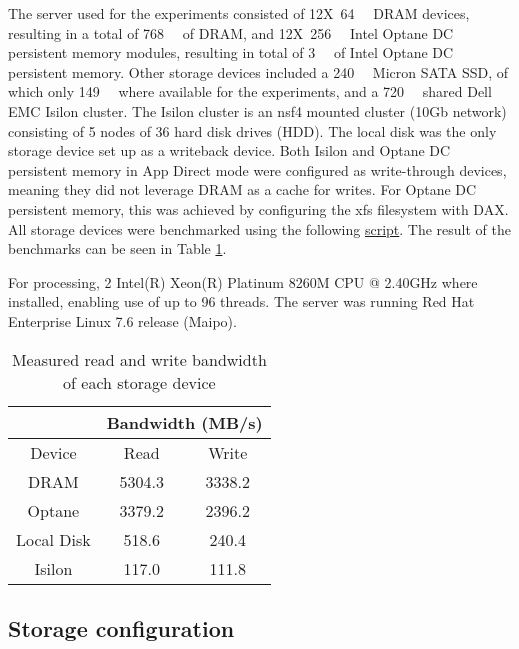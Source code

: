 \documentclass[conference]{IEEEtran}
\begin{document}
The server used for the experiments consisted of 12X~\SI{64}{\gibi\byte} DRAM devices,
resulting in a total of \SI{768}{\gibi\byte} of DRAM, and 12X~\SI{256}{\giga\byte} Intel Optane DC persistent memory
modules, resulting in total of \SI{3}{\tebi\byte} of Intel Optane DC persistent memory.
Other storage devices included a \SI{240}{\gibi\byte} Micron SATA SSD, of which
only \SI{149}{\gibi\byte} where available for the experiments, and a
\SI{720}{\tebi\byte} shared Dell EMC Isilon cluster. The Isilon cluster is an nsf4 mounted
cluster (10Gb network) consisting of 5 nodes of 36 hard disk drives (HDD). The local disk
was the only storage device set up as a writeback device. Both Isilon and Optane DC persistent memory in
App Direct mode were configured as write-through devices, meaning they did not leverage
DRAM as a cache for writes. For Optane DC persistent memory, this was achieved by configuring the xfs filesystem with
DAX. All storage devices were benchmarked using the following \href{https://github.com/ValHayot/paper-memory-storage/scripts/bench_disks.sh}{script}.
The result of the benchmarks can be seen in Table \ref{table:bandwidths}.

For processing,
2 Intel(R) Xeon(R) Platinum 8260M CPU @ 2.40GHz where installed, enabling use of up to 96 threads.
The server was running Red Hat Enterprise Linux 7.6 release (Maipo). 


\begin{table}
\begin{center}
 \begin{tabular}{ |c|c|c| } 
     \cline{2-3}
     \multicolumn{1}{c|}{} & \multicolumn{2}{c|}{Bandwidth (MB/s)} \\\hline
  Device & Read & Write \\
 \hline
 DRAM & 5304.3 & 3338.2 \\  
 Optane & 3379.2 & 2396.2 \\   
 Local Disk & 518.6 & 240.4 \\
 Isilon & 117.0 & 111.8 \\
 \hline
\end{tabular}\caption{Measured read and write bandwidth of each storage device}\label{table:bandwidths}
\end{center}
\end{table}



\subsection{Storage configuration}
\end{document}
